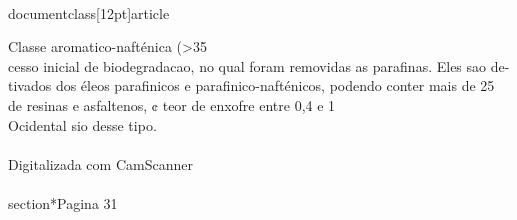 \\documentclass[12pt]{article}
\begin{document}
{Classe aromatico-nafténica (>35\\%
cesso inicial de biodegradacao, no qual foram removidas as parafinas. Eles sao de-\\
tivados dos éleos parafinicos e parafinico-nafténicos, podendo conter mais de 25\\%
de resinas e asfaltenos, ¢ teor de enxofre entre 0,4 e 1\\%
Ocidental sio desse tipo.\\
\\
Digitalizada com CamScanner\\

\\section*{Pagina 31}

}
\end{document}
